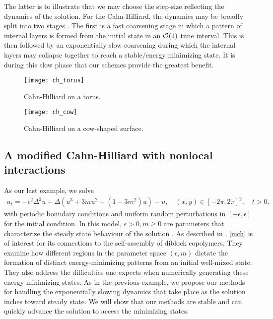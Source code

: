 The latter is to illustrate that we may choose the step-size reflecting the dynamics of the solution. For the Cahn-Hilliard, the dynamics may be broadly split into two stages \cite{sun2000dynamics}. The first is a fast coarsening stage in which a pattern of internal layers is formed from the initial state in an $\mathcal{O}(1)$ time interval. This is then followed by an exponentially slow coarsening during which the internal layers may collapse together to reach a stable/energy minimizing state. It is during this slow phase that our schemes provide the greatest benefit. 

\begin{figure}[htb!]
	\centering
\texttt{[image: ch\_torus]}
\caption[Cahn-Hilliard on a torus.]{Cahn-Hilliard on a torus.}
\label{fig:ch torus}
\end{figure}
\begin{figure}[htb!]
	\centering
\texttt{[image: ch\_cow]}
\caption[Cahn-Hilliard on a cow-shaped surface.]{Cahn-Hilliard on a cow-shaped surface.}
\label{fig:ch cow}
\end{figure}

\subsection{A modified Cahn-Hilliard with nonlocal interactions}
As our last example, we solve 
\begin{align}
        u_t = -\epsilon^2 \Delta^2 u + \Delta (u^3 + 3mu^2 - (1-3m^2)u) - u, 
\quad (x,y)\in[-2\pi,2\pi]^2,
\quad t>0,
\label{mch}
\end{align}
with periodic boundary conditions and uniform random perturbations in $[-\epsilon,\epsilon]$ for the initial condition. In this model, $\epsilon>0, m\geq 0$ are parameters that characterize the steady state behaviour of the solution \cite{choksi2009phase,choksi20112d}. As described in \cite{choksi2009phase}, \cref{mch} is of interest for its connections to the self-assembly of diblock copolymers. They examine how different regions in the parameter space $(\epsilon, m)$ dictate the formation of distinct energy-minimizing patterns from an initial well-mixed state. They also address the difficulties one expects when numerically generating these energy-minimizing states. As in the previous example, we propose our methods for handling the exponentially slowing dynamics that take place as the solution inches toward steady state. We will show that our methods are stable and can quickly advance the solution to access the minimizing states. 

